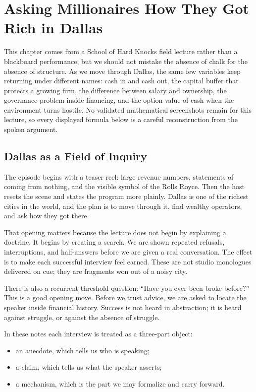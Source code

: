 \chapter{Asking Millionaires How They Got Rich in Dallas}

This chapter comes from a School of Hard Knocks field lecture rather than a blackboard performance, but we should not mistake the absence of chalk for the absence of structure. As we move through Dallas, the same few variables keep returning under different names: cash in and cash out, the capital buffer that protects a growing firm, the difference between salary and ownership, the governance problem inside financing, and the option value of cash when the environment turns hostile. No validated mathematical screenshots remain for this lecture, so every displayed formula below is a careful reconstruction from the spoken argument.

\section{Dallas as a Field of Inquiry}

The episode begins with a teaser reel: large revenue numbers, statements of coming from nothing, and the visible symbol of the Rolls Royce. Then the host resets the scene and states the program more plainly. Dallas is one of the richest cities in the world, and the plan is to move through it, find wealthy operators, and ask how they got there.

That opening matters because the lecture does not begin by explaining a doctrine. It begins by creating a search. We are shown repeated refusals, interruptions, and half-answers before we are given a real conversation. The effect is to make each successful interview feel earned. These are not studio monologues delivered on cue; they are fragments won out of a noisy city.

There is also a recurrent threshold question: ``Have you ever been broke before?'' This is a good opening move. Before we trust advice, we are asked to locate the speaker inside financial history. Success is not heard in abstraction; it is heard against struggle, or against the absence of struggle.

\begin{definition}
In these notes each interview is treated as a three-part object:
\begin{itemize}
\item an anecdote, which tells us who is speaking;
\item a claim, which tells us what the speaker asserts;
\item a mechanism, which is the part we may formalize and carry forward.
\end{itemize}
\end{definition}

